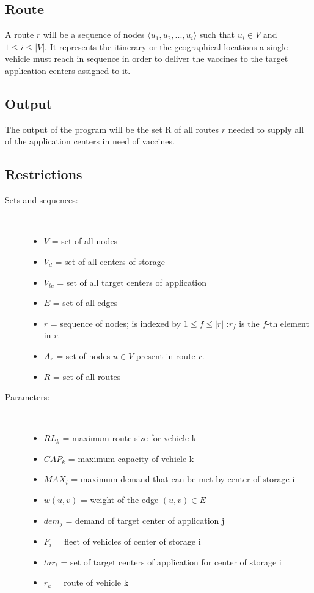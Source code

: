 \documentclass{article}
\begin{document}
\subsection{Route}
A route $r$ will be a sequence of nodes $\langle u_1, u_2, ..., u_i \rangle$ such that $u_i \in V$ and $1 \leq i \le |V|$. It represents the itinerary or the geographical locations a single vehicle must reach in sequence in order to deliver the vaccines to the target application centers assigned to it.
\subsection{Output}
The output of the program will be the set R of all routes $r$ needed to supply all of the application centers in need of vaccines. 
\subsection{Restrictions}
\begin{description}
\item[Sets and sequences:]\
     \begin{itemize}
        \item $V$ = set of all nodes
        \item $V_d$ = set of all centers of storage
        \item $V_{tc}$ = set of all target centers of application
        \item $E$ = set of all edges 
        \item $r$ = sequence of nodes; is indexed by $1\leq f \leq |r|$ :\;$r_f$ is the $f$-th element in $r$.
        \item $A_r$ = set of nodes $u\in V$ present in route $r$.
        \item $R$ = set of all routes
    \end{itemize}
\end{description}

\begin{description}
\item[Parameters:]\
     \begin{itemize}
        \item $RL_k$ = maximum route size for vehicle k
        \item $CAP_k$ = maximum capacity of vehicle k
        \item $MAX_i$ = maximum demand that can be met by center of storage i
        \item $w(u,v)$ = weight of the edge $(u,v)\in E$
        \item $dem_j$ = demand of target center of application j        
        \item $F_i$ = fleet of vehicles of center of storage i
        \item $tar_i$ = set of target centers of application for center of storage i
        \item $r_k$ = route of vehicle k
    \end{itemize}
\end{description}
\end{document}
